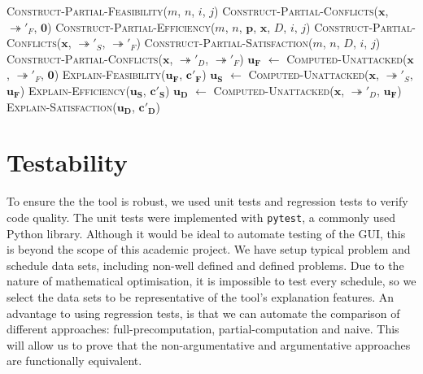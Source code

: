 \begin{algorithm}[H]
	\caption{}
	\begin{algorithmic}[1]
				\State \Return \textsc{Construct-Partial-Feasibility}($m$, $n$, $i$, $j$)
			\EndFunction
				\State \Return \textsc{Construct-Partial-Conflicts}($\mathbf{x}$, $\twoheadrightarrow'_F$, $\mathbf{0}$)
			\EndFunction
				\State \Return \textsc{Construct-Partial-Efficiency}($m$, $n$, $\mathbf{p}$, $\mathbf{x}$, $D$, $i$, $j$)
			\EndFunction
				\State \Return \textsc{Construct-Partial-Conflicts}($\mathbf{x}$, $\twoheadrightarrow'_S$, $\twoheadrightarrow'_F$)
			\EndFunction
				\State \Return \textsc{Construct-Partial-Satisfaction}($m$, $n$, $D$, $i$, $j$)
			\EndFunction
				\State \Return \textsc{Construct-Partial-Conflicts}($\mathbf{x}$, $\twoheadrightarrow'_D$, $\twoheadrightarrow'_F$)
			\EndFunction
			\State $\mathbf{u_F}$ $\gets$ \textsc{Computed-Unattacked}($\mathbf{x}$, $\twoheadrightarrow'_F$, $\mathbf{0}$)
			\State \textsc{Explain-Feasibility}($\mathbf{u_F}$, $\mathbf{c'_F}$)
			\State $\mathbf{u_S}$ $\gets$ \textsc{Computed-Unattacked}($\mathbf{x}$, $\twoheadrightarrow'_S$, $\mathbf{u_F}$)
			\State \textsc{Explain-Efficiency}($\mathbf{u_S}$, $\mathbf{c'_S}$)
			\State $\mathbf{u_D}$ $\gets$ \textsc{Computed-Unattacked}($\mathbf{x}$, $\twoheadrightarrow'_D$, $\mathbf{u_F}$)
			\State \textsc{Explain-Satisfaction}($\mathbf{u_D}$, $\mathbf{c'_D}$)
		\EndFunction
	\end{algorithmic}
\end{algorithm}

\section{Testability}
\label{testability}

To ensure the the tool is robust, we used unit tests and regression tests to verify code quality. The unit tests were implemented with \texttt{pytest}, a commonly used Python library. Although it would be ideal to automate testing of the GUI, this is beyond the scope of this academic project. We have setup typical problem and schedule data sets, including non-well defined and defined problems. Due to the nature of mathematical optimisation, it is impossible to test every schedule, so we select the data sets to be representative of the tool's explanation features. An advantage to using regression tests, is that we can automate the comparison of different approaches: full-precomputation, partial-computation and naive. This will allow us to prove that the non-argumentative and argumentative approaches are functionally equivalent.